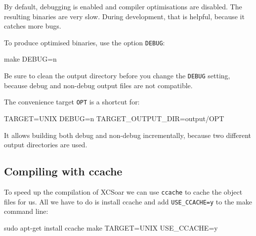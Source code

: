 By default, debugging is enabled and compiler optimisations are
disabled.  The resulting binaries are very slow.  During development,
that is helpful, because it catches more bugs.

To produce optimised binaries, use the option \texttt{DEBUG}:

\begin{verbatim*}
make DEBUG=n
\end{verbatim*}

Be sure to clean the output directory before you change the
\texttt{DEBUG} setting, because debug and non-debug output files are
not compatible.

The convenience target \texttt{OPT} is a shortcut for:

\begin{verbatim*}
TARGET=UNIX DEBUG=n TARGET_OUTPUT_DIR=output/OPT
\end{verbatim*}

It allows building both debug and non-debug incrementally, because two
different output directories are used.

\subsection{Compiling with ccache}

To speed up the compilation of XCSoar we can use \texttt{ccache} to cache the 
object files for us. All we have to do is install ccache and 
add 
\texttt{USE\_CCACHE=y} 
to the make command line:

\begin{verbatim*}
sudo apt-get install ccache
make TARGET=UNIX USE_CCACHE=y
\end{verbatim*}
